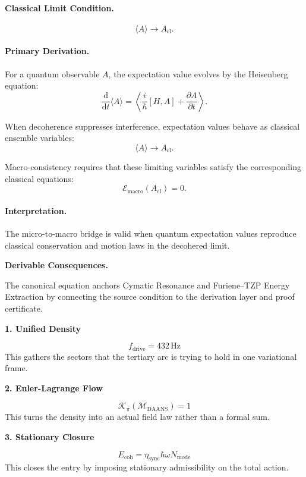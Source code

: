 \paragraph{Classical Limit Condition.}
\begin{equation}
\langle A\rangle
\longrightarrow
A_{\mathrm{cl}} .
\end{equation}

\paragraph{Primary Derivation.}
For a quantum observable $A$, the expectation value evolves by the Heisenberg equation:
\begin{equation}
\frac{\mathrm{d}}{\mathrm{d}t}\langle A\rangle
=
\left\langle
\frac{i}{\hbar}[H,A]
+
\frac{\partial A}{\partial t}
\right\rangle .
\end{equation}

When decoherence suppresses interference, expectation values behave as classical ensemble variables:
\begin{equation}
\langle A\rangle
\rightarrow
A_{\mathrm{cl}}.
\end{equation}

Macro-consistency requires that these limiting variables satisfy the corresponding classical equations:
\begin{equation}
\boxed{
\mathcal{E}_{\mathrm{macro}}(A_{\mathrm{cl}})=0 .
}
\end{equation}

\paragraph{Interpretation.}
The micro-to-macro bridge is valid when quantum expectation values reproduce classical conservation and motion laws in the decohered limit.

\par\vspace{0.35em}
\noindent\textbf{Derivable Consequences.}\quad
\begingroup
\footnotesize
\raggedright
The canonical equation anchors Cymatic Resonance and Furiene--TZP Energy Extraction by connecting the source condition to the derivation layer and proof certificate.
\par\endgroup

\noindent\textbf{1. Unified Density}\par
\[
f_{\mathrm{drive}}=432\,\mathrm{Hz}
\]
\noindent This gathers the sectors that the tertiary arc is trying to hold in one variational frame.\par
\noindent\textbf{2. Euler-Lagrange Flow}\par
\[
\mathcal{K}_{\pi}(\mathcal{M}_{\mathrm{DAANS}})=1
\]
\noindent This turns the density into an actual field law rather than a formal sum.\par
\noindent\textbf{3. Stationary Closure}\par
\[
E_{\mathrm{coh}}=\eta_{\mathrm{sync}}\hbar\omega N_{\mathrm{mode}}
\]
\noindent This closes the entry by imposing stationary admissibility on the total action.\par

